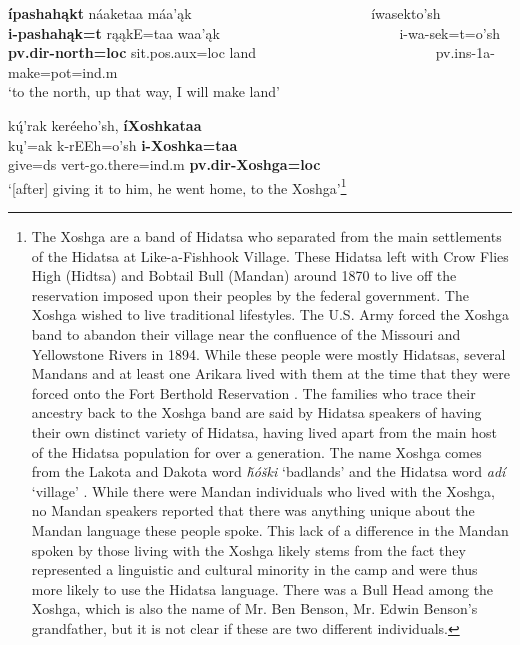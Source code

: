 \begin{exe}
\begin{xlist}
\item\label{ExamplesOfTaaWithI4} \glll \textbf{ípashahąkt} náaketaa máa'ąk ~ ~ ~ ~ ~ ~ ~ ~ ~ ~ ~ ~ ~ ~ ~  íwasekto'sh\\
    \textbf{i-pashahąk=t} rąąkE=taa waa'ąk ~ ~ ~ ~ ~ ~ ~ ~ ~ ~ ~ ~ ~ ~ ~  i-wa-sek=t=o'sh\\
    \textbf{pv.dir-\textnormal{\bfseries north}=loc} \textnormal{sit}.pos.aux=loc \textnormal{land} ~ ~ ~ ~ ~ ~ ~ ~ ~ ~ ~ ~ ~ ~ ~  pv.ins-1a-\textnormal{make}=pot=ind.m\\
    \glt `to the north, up that way, I will make land' \citep[9]{hollow1973a}
    
\item\label{ExamplesOfTaaWithI5} \glll kų́'rak keréeho'sh, \textbf{íXoshkataa}\\
    kų'=ak k-rEEh=o'sh \textbf{i-Xoshka=taa}\\
    \textnormal{give}=ds vert-\textnormal{go.there}=ind.m \textbf{pv.dir-\textnormal{\bfseries Xoshga}=loc}\\
    \glt `[after] giving it to him, he went home, to the Xoshga'\footnote{The Xoshga are a band of Hidatsa who separated from the main settlements of the Hidatsa at Like-a-Fishhook Village. These Hidatsa left with Crow Flies High (Hidtsa) and Bobtail Bull (Mandan) around 1870 to live off the reservation imposed upon their peoples by the federal government. The Xoshga wished to live traditional lifestyles. The U.S. Army forced the Xoshga band to abandon their village near the confluence of the Missouri and Yellowstone Rivers in 1894. While these people were mostly Hidatsas, several Mandans and at least one Arikara lived with them at the time that they were forced onto the Fort Berthold Reservation \citep[154ff]{malouf1963}. The families who trace their ancestry back to the Xoshga band are said by Hidatsa speakers of having their own distinct variety of Hidatsa, having lived apart from the main host of the Hidatsa population for over a generation. The name Xoshga comes from the Lakota and Dakota word \textit{ȟóški} `badlands' and the Hidatsa word \textit{adí} `village' \citep[6]{park2012}. While there were Mandan individuals who lived with the Xoshga, no Mandan speakers reported that there was anything unique about the Mandan language these people spoke. This lack of a difference in the Mandan spoken by those living with the Xoshga likely stems from the fact they represented a linguistic and cultural minority in the camp and were thus more likely to use the Hidatsa language. There was a Bull Head among the Xoshga, which is also the name of Mr. Ben Benson, Mr. Edwin Benson's grandfather, but it is not clear if these are two different individuals.} \citep[60]{hollow1973a}
    

\end{xlist}
\end{exe}
